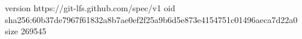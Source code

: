 version https://git-lfs.github.com/spec/v1
oid sha256:60b37de7967f61832a8b7ae0ef2f25a9b6d5e873e4154751c01496aeca7d22a0
size 269545
